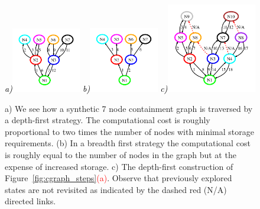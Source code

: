\begin{figure}[ht]
\center
{\footnotesize\textit{\textcolor{black}{a)}}}\includegraphics[width=0.27\textwidth]{figs/dfs_visit.pdf}
{\footnotesize\textit{\textcolor{black}{b)}}}\includegraphics[width=0.27\textwidth]{figs/bfs_visit.pdf}
{\footnotesize\textit{\textcolor{black}{c)}}}\includegraphics[width=0.35\textwidth]{figs/depth_first.pdf}
\caption{a) We see how a synthetic 7 node containment graph is traversed by a depth-first strategy. The computational cost is roughly proportional to two times the number of nodes with minimal storage requirements. (b) In a breadth first strategy the computational cost is roughly equal to the number of nodes in the graph but at the expense of increased storage. c) The depth-first construction of Figure~\ref{fig:cgraph_steps}\textcolor{red}{(a)}. Observe that previously explored states are not revisited as indicated by the dashed red (N/A) directed links. } 
\label{fig:dfs_traversal}
\end{figure}

